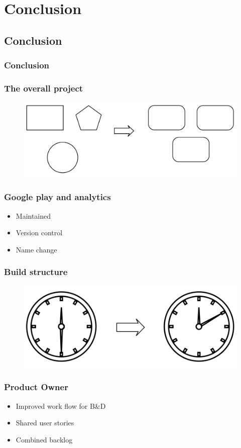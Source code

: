 \section{Conclusion}
\subsection{Conclusion}
\begin{frame}
	\frametitle{Conclusion}
\end{frame}

\begin{frame}
	\frametitle{The overall project}
	\begin{figure}[H]
		\centering
		\includegraphics[width= 0.8 \textwidth]{pictures/SameGUIDesign.png}
	\end{figure}
\end{frame}

\begin{frame}
	\frametitle{Google play and analytics}
	\begin{itemize}
		\item Maintained
		\item Version control
		\item Name change
	\end{itemize}
\end{frame}

\begin{frame}
	\frametitle{Build structure}
	\begin{figure}[H]
		\centering
		\includegraphics[width= 0.8 \textwidth]{pictures/Buildtime.png}
	\end{figure}
\end{frame}

\begin{frame}
	\frametitle{Product Owner}
	\begin{itemize}
		\item Improved work flow for B\&D
		\item Shared user stories
		\item Combined backlog
	\end{itemize}
\end{frame}

